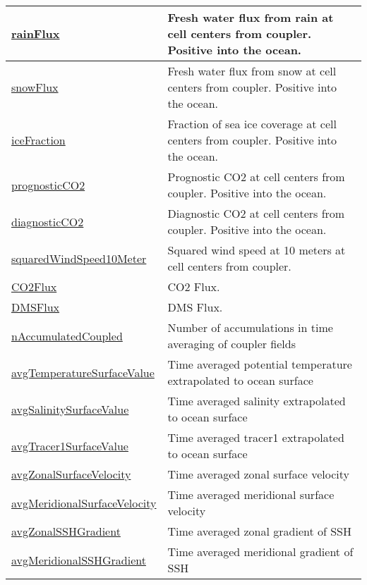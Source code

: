 {\begin{center}
\begin{longtable}{| p{2.0in} | p{4.0in} |}
	\hline
	\hyperref[subsec:var_sec_forcing_rainFlux]{rainFlux} & Fresh water flux from rain at cell centers from coupler. Positive into the ocean. \\
	\hline
	\hyperref[subsec:var_sec_forcing_snowFlux]{snowFlux} & Fresh water flux from snow at cell centers from coupler. Positive into the ocean. \\
	\hline
	\hyperref[subsec:var_sec_forcing_iceFraction]{iceFraction} & Fraction of sea ice coverage at cell centers from coupler. Positive into the ocean. \\
	\hline
	\hyperref[subsec:var_sec_forcing_prognosticCO2]{prognosticCO2} & Prognostic CO2 at cell centers from coupler. Positive into the ocean. \\
	\hline
	\hyperref[subsec:var_sec_forcing_diagnosticCO2]{diagnosticCO2} & Diagnostic CO2 at cell centers from coupler. Positive into the ocean. \\
	\hline
	\hyperref[subsec:var_sec_forcing_squaredWindSpeed10Meter]{squaredWindSpeed10Meter} & Squared wind speed at 10 meters at cell centers from coupler. \\
	\hline
	\hyperref[subsec:var_sec_forcing_CO2Flux]{CO2Flux} & CO2 Flux. \\
	\hline
	\hyperref[subsec:var_sec_forcing_DMSFlux]{DMSFlux} & DMS Flux. \\
	\hline
	\hyperref[subsec:var_sec_forcing_nAccumulatedCoupled]{nAccumulatedCoupled} & Number of accumulations in time averaging of coupler fields \\
	\hline
	\hyperref[subsec:var_sec_forcing_avgTemperatureSurfaceValue]{avgTemperatureSurfaceValue} & Time averaged potential temperature extrapolated to ocean surface \\
	\hline
	\hyperref[subsec:var_sec_forcing_avgSalinitySurfaceValue]{avgSalinitySurfaceValue} & Time averaged salinity extrapolated to ocean surface \\
	\hline
	\hyperref[subsec:var_sec_forcing_avgTracer1SurfaceValue]{avgTracer1SurfaceValue} & Time averaged tracer1 extrapolated to ocean surface \\
	\hline
	\hyperref[subsec:var_sec_forcing_avgZonalSurfaceVelocity]{avgZonalSurfaceVelocity} & Time averaged zonal surface velocity \\
	\hline
	\hyperref[subsec:var_sec_forcing_avgMeridionalSurfaceVelocity]{avgMeridionalSurfaceVelocity} & Time averaged meridional surface velocity \\
	\hline
	\hyperref[subsec:var_sec_forcing_avgZonalSSHGradient]{avgZonalSSHGradient} & Time averaged zonal gradient of SSH \\
	\hline
	\hyperref[subsec:var_sec_forcing_avgMeridionalSSHGradient]{avgMeridionalSSHGradient} & Time averaged meridional gradient of SSH \\
	\hline
\end{longtable}
\end{center}
}
